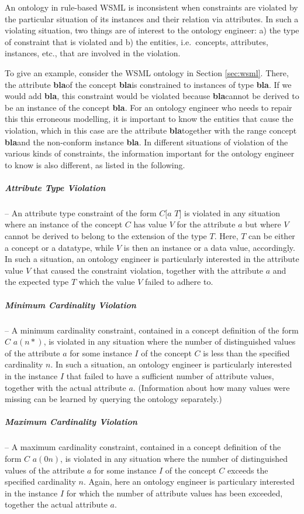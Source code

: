 An ontology in rule-based WSML is inconsistent when constraints
are violated by the particular situation of its instances and
their relation via attributes. In such a violating situation, two
things are of interest to the ontology engineer: a) the type of
constraint that is violated and b) the entities, i.e.\ concepts,
attributes, instances, etc., that are involved in the violation.

\def\bla{\textbf{{\sf bla}}}
To give an example, consider the WSML ontology in Section
\ref{sec:wsml}. There, the attribute \bla of the concept \bla is
constrained to instances of type \bla. If we would add \bla, this
constraint would be violated because \bla cannot be derived to be
an instance of the concept \bla. For an ontology engineer who
needs to repair this this erroneous modelling, it is important to
know the entities that cause the violation, which in this case are
the attribute \bla together with the range concept \bla and the
non-conform instance \bla. In different situations of violation of
the various kinds of constraints, the information important for
the ontology engineer to know is also different, as listed in the
following.

\subparagraph{Attribute Type Violation} -- An attribute type
constraint of the form $C[a$  $T]$ is violated in any
situation where an instance of the concept $C$ has value $V$ for
the attribute $a$ but where $V$ cannot be derived to belong to the
extension of the type $T$. Here, $T$ can be either a concept or a
datatype, while $V$ is then an instance or a data value,
accordingly. In such a situation, an ontology engineer is
particularly interested in the attribute value $V$ that caused the
constraint violation, together with the attribute $a$ and the
expected type $T$ which the value $V$ failed to adhere to.

\subparagraph{Minimum Cardinality Violation} -- A minimum
cardinality constraint, contained in a concept definition of the
form  $C$ $a (n *)$, is violated in any situation
where the number of distinguished values of the attribute $a$ for
some instance $I$ of the concept $C$ is less than the specified
cardinality $n$. In such a situation, an ontology engineer is
particularly interested in the instance $I$ that failed to have a
sufficient number of attribute values, together with the actual
attribute $a$. (Information about how many values were missing can
be learned by querying the ontology separately.)

\subparagraph{Maximum Cardinality Violation} -- A maximum
cardinality constraint, contained in a concept definition of the
form  $C$ $a (0 n)$, is violated in any situation
where the number of distinguished values of the attribute $a$ for
some instance $I$ of the concept $C$ exceeds the specified
cardinality $n$. Again, here an ontology engineer is particulary
interested in the instance $I$ for which the number of attribute
values has been exceeded, together the actual attribute $a$.

